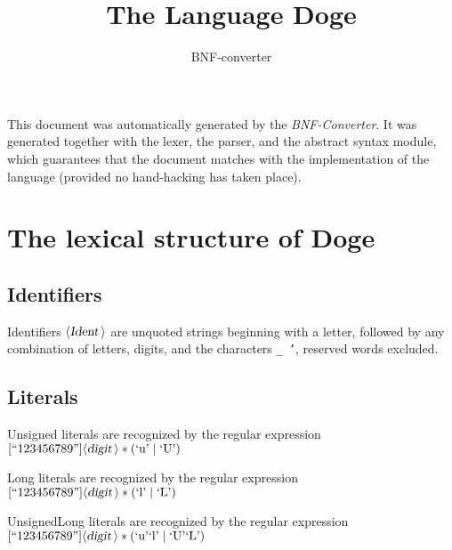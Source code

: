 \documentclass[a4paper,11pt]{article}
\author{BNF-converter}
\title{The Language Doge}
\begin{document}
\maketitle

\newcommand{\emptyP}{\mbox{$\epsilon$}}
\newcommand{\terminal}[1]{\mbox{{\texttt {#1}}}}
\newcommand{\nonterminal}[1]{\mbox{$\langle \mbox{{\sl #1 }} \! \rangle$}}
\newcommand{\arrow}{\mbox{::=}}
\newcommand{\delimit}{\mbox{$|$}}
\newcommand{\reserved}[1]{\mbox{{\texttt {#1}}}}
\newcommand{\literal}[1]{\mbox{{\texttt {#1}}}}
\newcommand{\symb}[1]{\mbox{{\texttt {#1}}}}

This document was automatically generated by the {\em BNF-Converter}. It was generated together with the lexer, the parser, and the abstract syntax module, which guarantees that the document matches with the implementation of the language (provided no hand-hacking has taken place).

\section*{The lexical structure of Doge}
\subsection*{Identifiers}
Identifiers \nonterminal{Ident} are unquoted strings beginning with a letter,
followed by any combination of letters, digits, and the characters {\tt \_ '},
reserved words excluded.


\subsection*{Literals}




















Unsigned literals are recognized by the regular expression
\([\mbox{``123456789''}] {\nonterminal{digit}}* (\mbox{`u'} \mid \mbox{`U'})\)

Long literals are recognized by the regular expression
\([\mbox{``123456789''}] {\nonterminal{digit}}* (\mbox{`l'} \mid \mbox{`L'})\)

UnsignedLong literals are recognized by the regular expression
\([\mbox{``123456789''}] {\nonterminal{digit}}* (\mbox{`u'} \mbox{`l'} \mid \mbox{`U'} \mbox{`L'})\)
\end{document}
